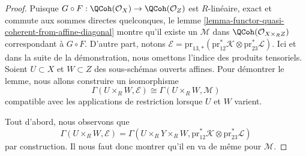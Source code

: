 \begin{proof}
Puisque $G \circ F : \QCoh(\mathcal{O}_X) \to \QCoh(\mathcal{O}_Z)$
est $R$-linéaire, exact et commute aux sommes directes quelconques,
le lemme \ref{lemma-functor-quasi-coherent-from-affine-diagonal} montre
qu'il existe un $\mathcal{M}$ dans
$\QCoh(\mathcal{O}_{X \times_R Z})$ correspondant à $G \circ F$.
D'autre part, notons
$\mathcal{E} = \text{pr}_{13, *}(\text{pr}_{12}^*\mathcal{K}
\otimes \text{pr}_{23}^*\mathcal{L})$. Ici et dans la suite de
la démonstration, nous omettons l'indice des produits tensoriels.
Soient $U \subset X$ et $W \subset Z$ des sous-schémas ouverts affines.
Pour démontrer le lemme, nous allons construire un isomorphisme
$$
\Gamma(U \times_R W, \mathcal{E})
\cong
\Gamma(U \times_R W, \mathcal{M})
$$
compatible avec les applications de restriction lorsque $U$ et $W$ varient.

\medskip\noindent
Tout d'abord, nous observons que
$$
\Gamma(U \times_R W, \mathcal{E}) =
\Gamma(U \times_R Y \times_R W,
\text{pr}_{12}^*\mathcal{K} \otimes \text{pr}_{23}^*\mathcal{L})
$$
par construction. Il nous faut donc montrer qu'il en va de même
pour $\mathcal{M}$.


\end{proof}
